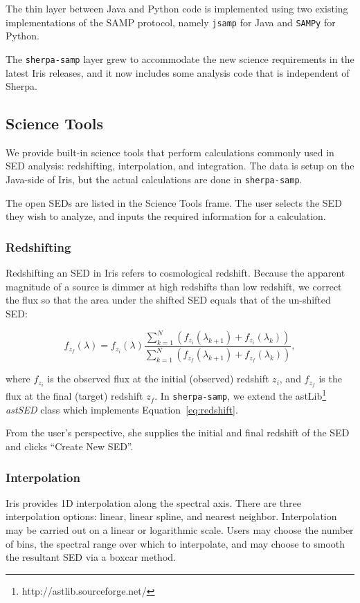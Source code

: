 \documentclass[final,5p]{elsarticle}
\begin{document}
The thin layer between Java and Python code is implemented using two existing implementations of the SAMP protocol, namely \verb|jsamp| for Java and \verb|SAMPy| for Python.

The \verb|sherpa-samp| layer grew to accommodate the new science requirements in the latest Iris releases, and it now includes some analysis code that is independent of Sherpa.

\subsection{Science Tools}
We provide built-in science tools that perform calculations commonly used in SED analysis: redshifting, interpolation, and integration. The data is setup on the Java-side of Iris, but the actual calculations are done in \verb|sherpa-samp|.

The open SEDs are listed in the Science Tools frame. The user selects the SED they wish to analyze, and inputs the required information for a calculation.

\subsubsection{Redshifting}
Redshifting an SED in Iris refers to cosmological redshift. Because the apparent magnitude of a source is dimmer at high redshifts than low redshift, we correct the flux so that the area under the shifted SED equals that of the un-shifted SED:

\begin{equation} \label{eq:redshift}
f_{z_{f}}(\lambda) = f_{z_{i}}(\lambda) \frac{\sum_{k=1}^N (f_{z_{i}}(\lambda_{k+1})+f_{z_{i}}(\lambda_{k}))}{\sum_{k=1}^N (f_{z_{f}}(\lambda_{k+1})+f_{z_{f}}(\lambda_{k}))},
\end{equation}

where $f_{z_i}$ is the observed flux at the initial (observed) redshift $z_i$, and $f_{z_f}$ is the flux at the final (target) redshift $z_f$. In \verb|sherpa-samp|, we extend the astLib\footnote{http://astlib.sourceforge.net/} \textit{astSED} class which implements Equation~\ref{eq:redshift}.

From the user's perspective, she supplies the initial and final redshift of the SED and clicks ``Create New SED''.

\subsubsection{Interpolation}
Iris provides 1D interpolation along the spectral axis. There are three interpolation options: linear, linear spline, and nearest neighbor. Interpolation may be carried out on a linear or logarithmic scale. Users may choose the number of bins, the spectral range over which to interpolate, and may choose to smooth the resultant SED via a boxcar method.
\end{document}
